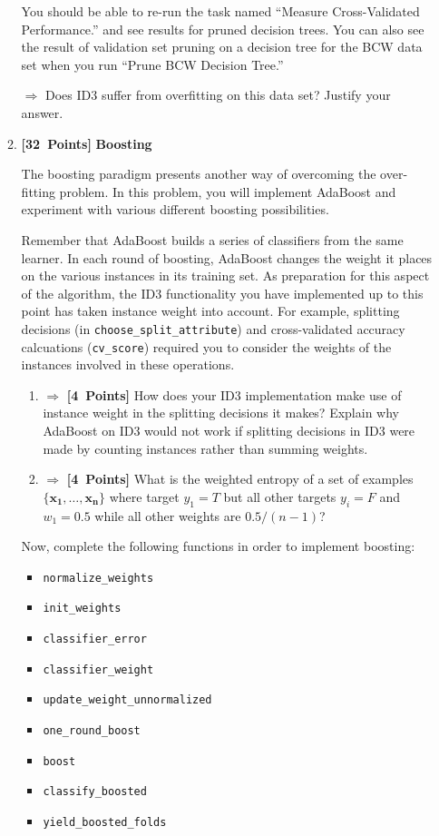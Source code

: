 \documentclass{article}
\newcommand{\points}[1]{\mbox{\textbf{[#1 Points]}}}
\begin{document}
\begin{enumerate}
\begin{enumerate}
  You should be able to re-run the task named ``Measure
  Cross-Validated Performance.'' and see results for pruned decision
  trees. You can also see the result of validation set pruning on a
  decision tree for the BCW data set when you run ``Prune BCW Decision
  Tree.''

  $\Rightarrow$ Does ID3 suffer from overfitting on this data set?
  Justify your answer.

\item \points{32} \textbf{Boosting}

The boosting paradigm presents another way of overcoming the
over-fitting problem.  In this problem,
you will implement AdaBoost and experiment with various different
boosting possibilities.

Remember that AdaBoost builds a series of classifiers from the same
learner. In each round of boosting, AdaBoost changes the weight it
places on the various instances in its training set. As preparation
for this aspect of the algorithm, the ID3 functionality you have
implemented up to this point has taken instance weight into
account. For example, splitting decisions (in
\verb=choose_split_attribute=) and cross-validated accuracy
calcuations (\verb=cv_score=) required you to consider the weights of
the instances involved in these operations.

\begin{enumerate}
\item $\Rightarrow$ \points{4} How does your ID3
implementation make use of instance weight in the splitting decisions
it makes? Explain why AdaBoost on ID3 would not work if splitting decisions
in ID3 were made by counting instances rather than summing weights.

 \item $\Rightarrow$ \points{4} What is the weighted entropy of a set of examples
   $\{\mathbf{x_1}, \ldots, \mathbf{x_n}\}$ where target $y_1 =
T$ but all other targets $y_i = F$ and $w_1 = 0.5$ while all other
weights are $0.5 / (n - 1)$?
\end{enumerate}

Now, complete the following functions in order to implement boosting:
\begin{itemize}
\item \verb=normalize_weights=
\item \verb=init_weights=
\item \verb=classifier_error=
\item \verb=classifier_weight=
\item \verb=update_weight_unnormalized=
\item \verb=one_round_boost=
\item \verb=boost=
\item \verb=classify_boosted=
\item \verb=yield_boosted_folds=
\end{itemize}


\end{enumerate}
\end{enumerate}
\end{document}
